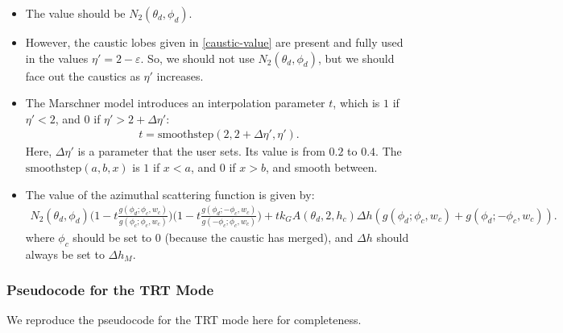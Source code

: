 \documentclass[10pt]{article}
\begin{document}
  \begin{itemize}
    \item The value should be $N_2(\theta_d, \phi_d)$.
      
    \item However, the caustic lobes given in \eqref{caustic-value}
    are present and fully used in the values $\eta' = 2-\varepsilon$.
    So, we should not use $N_2(\theta_d, \phi_d)$, but we should 
    face out the caustics as $\eta'$ increases.
    
    \item The Marschner model introduces an interpolation parameter
      $t$, which is $1$ if $\eta' < 2$, and $0$ if $\eta' > 2 + \Delta \eta'$:
      \begin{align*}
        t = \mathrm{smoothstep}(2, 2+\Delta \eta', \eta').
      \end{align*}
      Here, $\Delta \eta'$ is a parameter that the user sets.
      Its value is from $0.2$ to $0.4$. The $\mathrm{smoothstep}(a,b,x)$ is $1$ if $x < a$, and $0$ if $x > b$,
      and smooth between.
      
    \item The value of the azimuthal scattering function is given by:
    \begin{align*}
        N_2(\theta_d, \phi_d) \bigg(1 - t\frac{g(\phi_d;\phi_c, w_c)}{g(\phi_c; \phi_c, w_c)}\bigg) \bigg( 1 - t\frac{g(\phi_d;-\phi_c,w_c)}{g(-\phi_c;\phi_c,w_c)} \bigg) + 
        t k_G A(\theta_d, 2, h_c) \Delta h (g(\phi_d; \phi_c, w_c) +
        g(\phi_d; -\phi_c, w_c)).
      \end{align*}
    where $\phi_c$ should be set to 0 (because the caustic has
      merged), and $\Delta h$ should always be set to $\Delta h_M$.
  \end{itemize}
  
  \subsubsection{Pseudocode for the TRT Mode}
  
  We reproduce the pseudocode for the TRT mode here for completeness.
  
\end{document}
